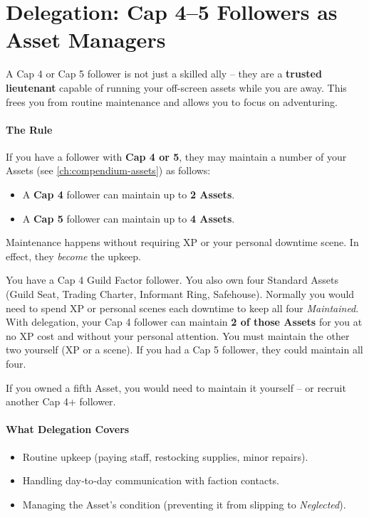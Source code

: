 \section{Delegation: Cap 4--5 Followers as Asset Managers}
\label{sec:delegation}

A Cap 4 or Cap 5 follower is not just a skilled ally -- they are a \textbf{trusted lieutenant} capable of running your off-screen assets while you are away. This frees you from routine maintenance and allows you to focus on adventuring.

\paragraph{The Rule}
If you have a follower with \textbf{Cap 4 or 5}, they may maintain a number of your Assets (see \ref{ch:compendium-assets}) as follows:
\begin{itemize}
  \item A \textbf{Cap 4} follower can maintain up to \textbf{2 Assets}.
  \item A \textbf{Cap 5} follower can maintain up to \textbf{4 Assets}.
\end{itemize}
Maintenance happens without requiring XP or your personal downtime scene. In effect, they \emph{become} the upkeep.

\begin{tcolorbox}[colback=green!5!white,colframe=green!75!black,title=Delegation Example]
You have a Cap 4 Guild Factor follower. You also own four Standard Assets (Guild Seat, Trading Charter, Informant Ring, Safehouse). Normally you would need to spend XP or personal scenes each downtime to keep all four \emph{Maintained}. With delegation, your Cap 4 follower can maintain \textbf{2 of those Assets} for you at no XP cost and without your personal attention. You must maintain the other two yourself (XP or a scene). If you had a Cap 5 follower, they could maintain all four.

If you owned a fifth Asset, you would need to maintain it yourself -- or recruit another Cap 4+ follower.
\end{tcolorbox}

\paragraph{What Delegation Covers}
\begin{itemize}
  \item Routine upkeep (paying staff, restocking supplies, minor repairs).
  \item Handling day‑to‑day communication with faction contacts.
  \item Managing the Asset's condition (preventing it from slipping to \emph{Neglected}).
\end{itemize}

